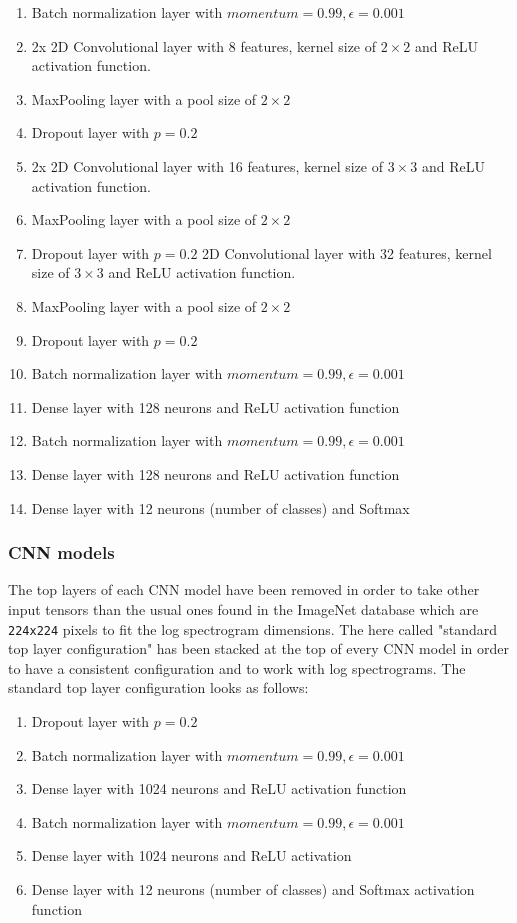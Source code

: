 \documentclass{article}
\theoremstyle{definition}
\theoremstyle{remark}
\begin{document}
\begin{enumerate}
		\item Batch normalization layer with $momentum=0.99, \epsilon=0.001$
		\item 2x 2D Convolutional layer with 8 features, kernel size of $2 \times 2$ and ReLU activation function.
		\item MaxPooling layer with a pool size of $2 \times 2$
		\item Dropout layer with $p = 0.2$
		\item 2x 2D Convolutional layer with 16 features, kernel size of $3 \times 3$ and ReLU activation function.
		\item MaxPooling layer with a pool size of $2 \times 2$
		\item Dropout layer with $p = 0.2$
		2D Convolutional layer with 32 features, kernel size of $3 \times 3$ and ReLU activation function.
			\item MaxPooling layer with a pool size of $2 \times 2$
			\item Dropout layer with $p = 0.2$
		\item Batch normalization layer with $momentum=0.99, \epsilon=0.001$
			\item Dense layer with 128 neurons and ReLU activation function
		\item Batch normalization layer with $momentum=0.99, \epsilon=0.001$
		\item Dense layer with 128 neurons and ReLU activation function
		\item Dense layer with 12 neurons (number of classes) and Softmax
		
\end{enumerate}


\subsubsection{CNN models}

The top layers of each CNN model have been removed in order to take other input tensors than the usual ones found in the ImageNet database which are \texttt{224x224} pixels to fit the log spectrogram dimensions. The here called "standard top layer configuration" has been stacked at the top of every CNN model in order to have a consistent configuration and to work with log spectrograms. The standard top layer configuration looks as follows:

\begin{enumerate}
	\item Dropout layer with $p = 0.2$
	\item Batch normalization layer with $momentum=0.99, \epsilon=0.001$
	\item Dense layer with 1024 neurons and ReLU activation function
	\item Batch normalization layer with $momentum=0.99, \epsilon=0.001$
	\item Dense layer with 1024 neurons and ReLU activation
	\item Dense layer with 12 neurons (number of classes) and Softmax activation function
\end{enumerate}
\end{document}
